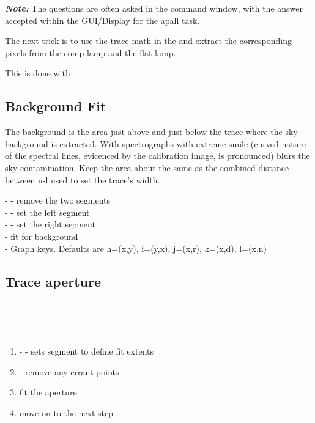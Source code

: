\textbf{\emph{Note:}} The questions are often asked in the command window, with the
answer accepted within the GUI/Display for the apall task.


The next trick is to use the trace math in the  and
extract the corresponding pixels from the comp lamp and the flat lamp.

This is done with 


\subsection{Background Fit}

The background is the area just above and just below the trace
where the sky background is extracted. With spectrographs with
extreme smile (curved nature of the spectral lines, evicenced
by the calibration image, is pronounced) blurs the sky contamination.
Keep the area about the same as the combined distance between u-l
used to set the trace's width. 

- - remove the two segments \\
- - set the left segment \\
- - set the right segment \\
 - fit for background \\

-	Graph keys.  Defaults are h=(x,y), i=(y,x), j=(x,r), k=(x,d), l=(x,n)




\subsection{Trace aperture}

 \\
 \\
 \\

\vspace{-.15cm}
\begin{enumerate}\addtolength{\itemsep}{-0.5\baselineskip}
   \item  {}- - sets segment to define fit extents
   \item  {} - remove any errant points
   \item  {}   fit the aperture
   \item  {} move on to the next step
\end{enumerate}


